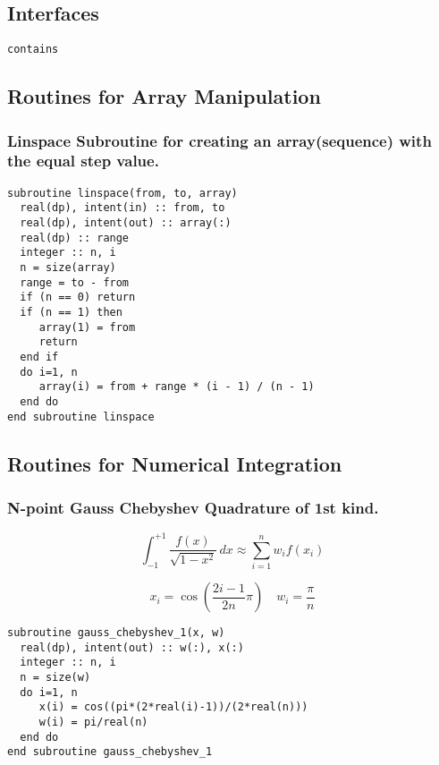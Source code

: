\documentclass[a4paper,11pt,twoside]{article}
\begin{document}
\subsection{Interfaces}
\label{sec:org1b6f9f0}

\begin{verbatim}
contains
\end{verbatim}
\subsection{Routines for Array Manipulation}
\label{sec:org77fe6d6}
\subsubsection{Linspace Subroutine for creating an array(sequence) with the equal step value.}
\label{sec:org9333989}

\begin{verbatim}
subroutine linspace(from, to, array)
  real(dp), intent(in) :: from, to
  real(dp), intent(out) :: array(:)
  real(dp) :: range
  integer :: n, i
  n = size(array)
  range = to - from
  if (n == 0) return
  if (n == 1) then
     array(1) = from
     return
  end if
  do i=1, n
     array(i) = from + range * (i - 1) / (n - 1)
  end do
end subroutine linspace
\end{verbatim}

\subsection{Routines for Numerical Integration}
\label{sec:org097f986}
\subsubsection{N-point Gauss Chebyshev Quadrature of 1st kind.}
\label{sec:org18f1106}

$$
\int _{-1}^{+1}{\frac {f(x)}{\sqrt {1-x^{2}}}}\,dx\approx \sum _{i=1}^{n}w_{i}f(x_{i})
$$

$$
x_{i}= \cos \left({\frac {2i-1}{2n}}\pi \right) \quad w_{i}=\frac {\pi }{n}
$$

\begin{verbatim}
subroutine gauss_chebyshev_1(x, w)
  real(dp), intent(out) :: w(:), x(:)
  integer :: n, i
  n = size(w)
  do i=1, n
     x(i) = cos((pi*(2*real(i)-1))/(2*real(n)))
     w(i) = pi/real(n)
  end do
end subroutine gauss_chebyshev_1
\end{verbatim}
\end{document}

